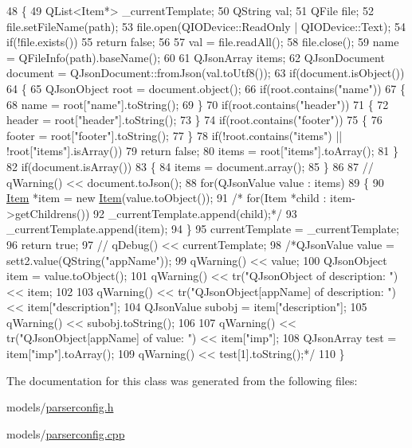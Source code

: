 \begin{DoxyCode}
48 \{
49     QList<Item*> \_currentTemplate;
50     QString val;
51     QFile file;
52     file.setFileName(path);
53     file.open(QIODevice::ReadOnly | QIODevice::Text);
54     \textcolor{keywordflow}{if}(!file.exists())
55         \textcolor{keywordflow}{return} \textcolor{keyword}{false};
56 
57     val = file.readAll();
58     file.close();
59     name = QFileInfo(path).baseName();
60 
61     QJsonArray items;
62     QJsonDocument document = QJsonDocument::fromJson(val.toUtf8());
63     \textcolor{keywordflow}{if}(document.isObject())
64     \{
65         QJsonObject root = document.object();
66         \textcolor{keywordflow}{if}(root.contains(\textcolor{stringliteral}{"name"}))
67         \{
68             name = root[\textcolor{stringliteral}{"name"}].toString();
69         \}
70         \textcolor{keywordflow}{if}(root.contains(\textcolor{stringliteral}{"header"}))
71         \{
72             header = root[\textcolor{stringliteral}{"header"}].toString();
73         \}
74         \textcolor{keywordflow}{if}(root.contains(\textcolor{stringliteral}{"footer"}))
75         \{
76             footer = root[\textcolor{stringliteral}{"footer"}].toString();
77         \}
78         \textcolor{keywordflow}{if}(!root.contains(\textcolor{stringliteral}{"items"}) || !root[\textcolor{stringliteral}{"items"}].isArray())
79             \textcolor{keywordflow}{return} \textcolor{keyword}{false};
80         items = root[\textcolor{stringliteral}{"items"}].toArray();
81     \}
82     \textcolor{keywordflow}{if}(document.isArray())
83     \{
84         items = document.array();
85     \}
86 
87     \textcolor{comment}{// qWarning() << document.toJson();}
88     \textcolor{keywordflow}{for}(QJsonValue value : items)
89     \{
90         \hyperlink{class_item}{Item} *item = \textcolor{keyword}{new} \hyperlink{class_item}{Item}(value.toObject());
91         \textcolor{comment}{/* for(Item *child : item->getChildrens())}
92 \textcolor{comment}{            \_currentTemplate.append(child);*/}
93         \_currentTemplate.append(item);
94     \}
95     currentTemplate = \_currentTemplate;
96     \textcolor{keywordflow}{return} \textcolor{keyword}{true};
97     \textcolor{comment}{//   qDebug() << currentTemplate;}
98     \textcolor{comment}{/*QJsonValue value = sett2.value(QString("appName"));}
99 \textcolor{comment}{      qWarning() << value;}
100 \textcolor{comment}{      QJsonObject item = value.toObject();}
101 \textcolor{comment}{      qWarning() << tr("QJsonObject of description: ") << item;}
102 \textcolor{comment}{}
103 \textcolor{comment}{      qWarning() << tr("QJsonObject[appName] of description: ") << item["description"];}
104 \textcolor{comment}{      QJsonValue subobj = item["description"];}
105 \textcolor{comment}{      qWarning() << subobj.toString();}
106 \textcolor{comment}{}
107 \textcolor{comment}{      qWarning() << tr("QJsonObject[appName] of value: ") << item["imp"];}
108 \textcolor{comment}{      QJsonArray test = item["imp"].toArray();}
109 \textcolor{comment}{      qWarning() << test[1].toString();*/}
110 \}
\end{DoxyCode}


The documentation for this class was generated from the following files\+:\begin{DoxyCompactItemize}
\item 
models/\hyperlink{parserconfig_8h}{parserconfig.\+h}\item 
models/\hyperlink{parserconfig_8cpp}{parserconfig.\+cpp}\end{DoxyCompactItemize}
